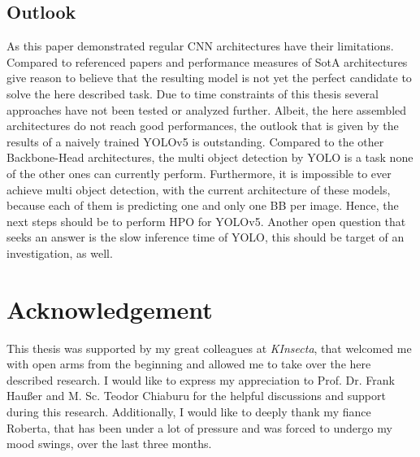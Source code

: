 \subsection{Outlook}\label{subsec:outlooks}
As this paper demonstrated regular CNN architectures have their limitations.
Compared to referenced papers and performance measures of SotA architectures give reason to believe that the resulting model is not yet the perfect candidate to solve the here described task.
Due to time constraints of this thesis several approaches have not been tested or analyzed further.
Albeit, the here assembled architectures do not reach good performances, the outlook that is given by the results of a naively trained YOLOv5 is outstanding.
Compared to the other Backbone-Head architectures, the multi object detection by YOLO is a task none of the other ones can currently perform.
Furthermore, it is impossible to ever achieve multi object detection, with the current architecture of these models, because each of them is predicting one and only one BB per image.
Hence, the next steps should be to perform HPO for YOLOv5.
Another open question that seeks an answer is the slow inference time of YOLO, this should be target of an investigation, as well.

\section{Acknowledgement}
This thesis was supported by my great colleagues at \textit{KInsecta}, that welcomed me with open arms from the beginning and allowed me to take over the here described research.
I would like to express my appreciation to Prof. Dr. Frank Haußer and M. Sc. Teodor Chiaburu for the helpful discussions and support during this research.
Additionally, I would like to deeply thank my fiance Roberta, that has been under a lot of pressure and was forced to undergo my mood swings, over the last three months.
